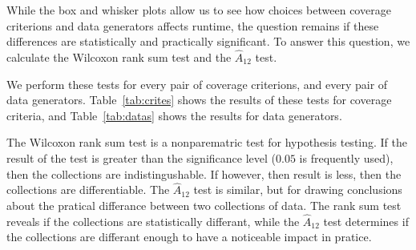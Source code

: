 
While the box and whisker plots allow us to see how choices between coverage criterions and data generators affects
runtime, the question remains if these differences are statistically and practically significant. To answer this
question, we calculate the Wilcoxon rank sum test and the $\hat{A}_{12}$ test.

We perform these tests for every pair of coverage criterions, and every pair of data generators.  Table~\ref{tab:crites}
shows the results of these tests for coverage criteria, and Table~\ref{tab:datas} shows the results for data generators.

The Wilcoxon rank sum test is a nonparematric test for hypothesis
testing.  If the result of the test is greater than the significance
level ($0.05$ is frequently used), then the collections are
indistingushable.  If however, then result is less, then the collections
are differentiable.  The $\hat{A}_{12}$ test is similar, but for drawing
conclusions about the pratical differance between two collections of
data.  The rank sum test reveals if the collections are statistically differant, while
the $\hat{A}_{12}$ test determines if the collections are differant
enough to have a noticeable impact in pratice.


